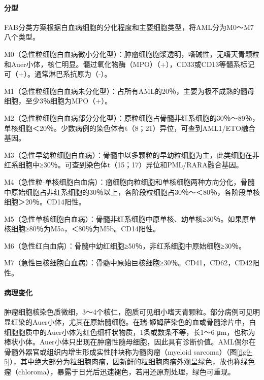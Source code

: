 \paragraph{分型}
FAB分类方案根据白血病细胞的分化程度和主要细胞类型，将AML分为M0～M7八个类型。

M0（急性粒细胞白血病微小分化型）：肿瘤细胞胞浆透明，嗜碱性，无嗜天青颗粒和Auer小体，核仁明显。髓过氧化物酶（MPO）（+），CD33或CD13等髓系标记可（+）。通常淋巴系抗原为（-）。

M1（急性粒细胞白血病未分化型）：占所有AML的20％，主要为极不成熟的髓母细胞，至少3％细胞为MPO（+）。

M2（急性粒细胞白血病部分分化型）：原粒细胞占骨髓非红系细胞的30％～89％，单核细胞＜20％。少数病例的染色体有t（8；21）异位，可查到AML1/ETO融合基因。

M3（急性早幼粒细胞白血病）：骨髓中以多颗粒的早幼粒细胞为主，此类细胞在非红系细胞中≥30％。可查到染色体t（15；17）异位和PML/RARA融合基因。

M4（急性粒-单核细胞白血病）：瘤细胞向粒细胞和单核细胞两种方向分化，骨髓中原始细胞占非红系细胞的30％以上，各阶段粒细胞占30％～＜80％，各阶段单核细胞＞20％。CD14阳性。

M5（急性单核细胞白血病）：骨髓非红系细胞中原单核、幼单核≥30％。如果原单核细胞≥80％为M5a，＜80％为M5b。CD14阳性。

M6（急性红白血病）：骨髓中幼红细胞≥50％，非红系细胞中原始细胞≥30％。

M7（急性巨核细胞白血病）：骨髓中原始巨核细胞≥30％。CD41，CD62，CD42阳性。

\paragraph{病理变化}
肿瘤细胞核染色质微细，3～4个核仁，胞质可见细小嗜天青颗粒。部分病例可见明显红染的Auer小体，尤其在原始髓细胞。在瑞-姬姆萨染色的血或骨髓涂片中，白细胞胞质中的Auer小体为红色细杆状物质，1条或数条不等，长1～6
μm，也称为棒状小体。Auer小体只出现在肿瘤性髓母细胞，因此具有诊断价值。AML偶尔在骨髓外器官或组织内增生形成实性肿块称为髓肉瘤（myeloid
sarcoma）（图\ref{fig9-5}），其中绝大部分为粒细胞肉瘤，因新鲜的粒细胞肉瘤外观呈绿色，故也称绿色瘤（chloroma），暴露于日光后迅速褪色，若用还原剂处理，绿色可重现。

